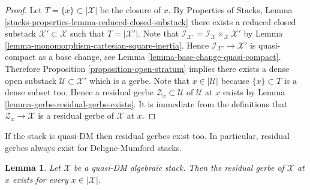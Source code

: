\documentclass{stacks-project}
\theoremstyle{plain}
\newtheorem{lemma}[subsection]{Lemma}
\theoremstyle{definition}
\theoremstyle{remark}
\numberwithin{equation}{subsection}
\begin{document}
\begin{proof}
Let $T = \overline{\{x\}} \subset |\mathcal{X}|$ be the closure of $x$.
By
Properties of Stacks, Lemma
\ref{stacks-properties-lemma-reduced-closed-substack}
there exists a reduced closed substack $\mathcal{X}' \subset \mathcal{X}$
such that $T = |\mathcal{X}'|$. Note that
$\mathcal{I}_{\mathcal{X}'} =
\mathcal{I}_\mathcal{X} \times_\mathcal{X} \mathcal{X}'$ by
Lemma \ref{lemma-monomorphism-cartesian-square-inertia}.
Hence $\mathcal{I}_{\mathcal{X}'} \to \mathcal{X}'$ is
quasi-compact as a base change, see
Lemma \ref{lemma-base-change-quasi-compact}.
Therefore
Proposition \ref{proposition-open-stratum}
implies there exists a dense open substack
$\mathcal{U} \subset \mathcal{X}'$
which is a gerbe. Note that $x \in |\mathcal{U}|$ because $\{x\} \subset T$
is a dense subset too. Hence a residual gerbe
$\mathcal{Z}_x \subset \mathcal{U}$ of $\mathcal{U}$ at $x$ exists by
Lemma \ref{lemma-gerbe-residual-gerbe-exists}.
It is immediate from the definitions that $\mathcal{Z}_x \to \mathcal{X}$
is a residual gerbe of $\mathcal{X}$ at $x$.
\end{proof}

\noindent
If the stack is quasi-DM then residual gerbes exist too.
In particular, residual gerbes always exist for Deligne-Mumford stacks.

\begin{lemma}
\label{lemma-every-point-residual-gerbe-quasi-DM}
Let $\mathcal{X}$ be a quasi-DM algebraic stack.
Then the residual gerbe of $\mathcal{X}$ at $x$ exists for
every $x \in |\mathcal{X}|$.
\end{lemma}
\end{document}
